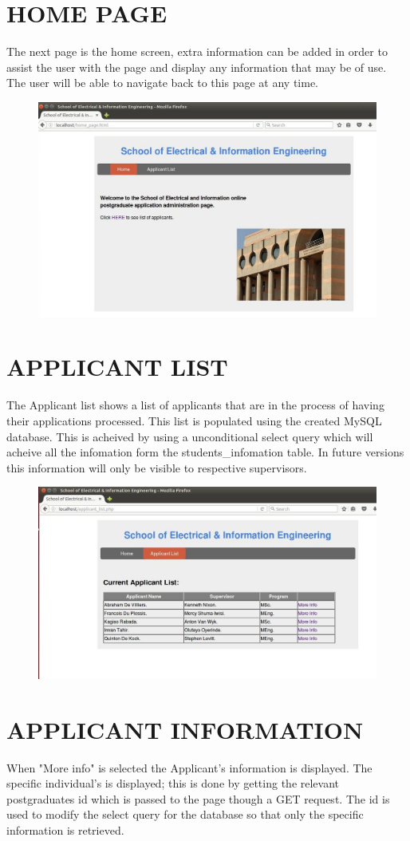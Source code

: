 \documentclass[journal,comsoc,onecolumn]{IEEEtran}
\begin{document}
\section{HOME PAGE}
The next page is the home screen, extra information can be added in order to assist the user with the page and display any information that may be of use. The user will be able to navigate back to this page at any time. 

\begin{figure}[h]
	\centering
	\includegraphics[width=0.7\linewidth]{home}
	\caption{}
	\label{fig:home}
\end{figure}
\section{APPLICANT LIST}
The Applicant list shows a list of applicants that are in the process of having their applications processed. This list is populated using the created MySQL database. This is acheived by using a unconditional select query which will acheive all the infomation form the students\_infomation table. In future versions this information will only be visible to respective supervisors. 

\begin{figure}[h]
\centering
\includegraphics[width=0.7\linewidth]{list}
\caption{}
\label{fig:list}
\end{figure}

\section{APPLICANT INFORMATION}
When "More info" is selected the Applicant's information is displayed. The specific individual's is displayed; this is done by getting the relevant postgraduates id which is passed to the page though a GET request. The id is used to modify the select query for the database so that only the specific information is retrieved. 
\end{document}
